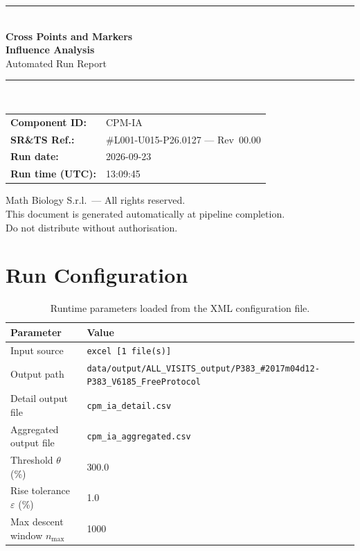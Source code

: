 \documentclass[a4paper,11pt]{article}
\begin{document}
\begin{titlepage}
\begin{center}
  \vspace*{1.8cm}
  {\color{dmaaccent}\rule{\linewidth}{1.5pt}}\\[0.6cm]
  {\LARGE\bfseries\color{dmaaccent}
    Cross Points and Markers\\[0.25cm]
    Influence Analysis}\\[0.4cm]
  {\Large Automated Run Report}\\[0.3cm]
  {\color{dmaaccent}\rule{\linewidth}{1.5pt}}\\[2cm]

  \begin{tabular}{ll}
    \textbf{Component ID:}   & CPM-IA \\[0.3cm]
    \textbf{SR\&TS Ref.:}    & \#L001-U015-P26.0127 --- Rev~00.00 \\[0.3cm]
    \textbf{Run date:}       & 2026-09-23 \\[0.3cm]
    \textbf{Run time (UTC):} & 13:09:45 \\
  \end{tabular}

  \vfill
  {\color{dmagray}\small
    Math Biology S.r.l.\ --- All rights reserved.\\
    This document is generated automatically at pipeline completion.\\
    Do not distribute without authorisation.}
\end{center}
\end{titlepage}

\tableofcontents
\clearpage

\section{Run Configuration}

\begin{table}[h!]
\centering
\small
\caption{Runtime parameters loaded from the XML configuration file.}
\begin{tabular}{ll}
\toprule
\textbf{Parameter} & \textbf{Value} \\
\midrule
Input source                      & \texttt{excel [1 file(s)]} \\
Output path                       & \texttt{data/output/ALL\_VISITS\_output/P383\_\#2017m04d12-P383\_V6185\_FreeProtocol} \\
Detail output file                & \texttt{cpm\_ia\_detail.csv} \\
Aggregated output file            & \texttt{cpm\_ia\_aggregated.csv} \\
Threshold $\theta$ (\%)           & 300.0 \\
Rise tolerance $\varepsilon$ (\%) & 1.0 \\
Max descent window $n_{\max}$     & 1000 \\
\bottomrule
\end{tabular}
\end{table}
\end{document}
